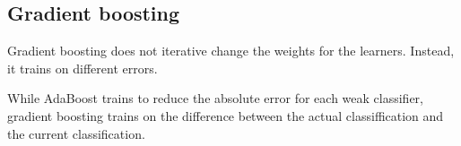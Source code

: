 
\subsection{Gradient boosting}

Gradient boosting does not iterative change the weights for the learners. Instead, it trains on different errors.

While AdaBoost trains to reduce the absolute error for each weak classifier, gradient boosting trains on the difference between the actual classiffication and the current classification.


